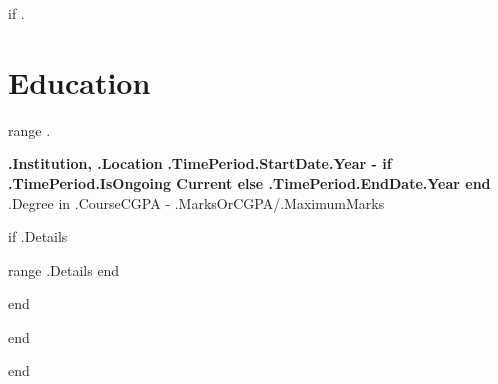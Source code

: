 
{{if .}}
    \section{Education}
    \resumeSubHeadingListStart

    {{range .}}
        \resumeSubheading

        {\textbf{ {{.Institution}}, {{.Location}} }}{\textbf{ {{.TimePeriod.StartDate.Year}} - {{if .TimePeriod.IsOngoing}} Current {{else}} {{.TimePeriod.EndDate.Year}} {{end}}} }
        { {{.Degree}} in {{.Course}}}{CGPA - {{.MarksOrCGPA}}/{{.MaximumMarks}} }

        {{if .Details}}
            \resumeItemListStart

            {{range .Details}}
            {{end}}

            \resumeItemListEnd
        {{end}}

        \resumeSubHeadingListEnd
    {{end}}

{{end}}
